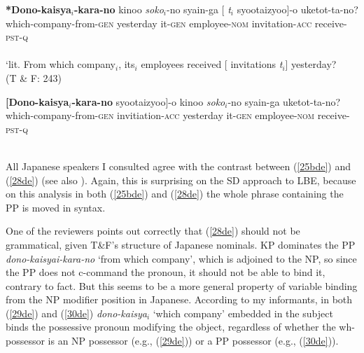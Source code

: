 \documentclass[
    output=paper,
    colorlinks,
    citecolor=brown,
]{langscibook}
\begin{document}
\begin{exe}
\begin{xlist}
\gll \textbf{*Dono-kaisya}$_{i}$\textbf{-kara-no}  kinoo  \textit{soko}$_{i}$-no syain-ga [ \textit{t}$_{i}$    syootaizyoo]-o uketot-ta-no?\\
which-company-from-\textsc{gen} yesterday it-\textsc{gen} employee-\textsc{nom} {} {} invitation-\textsc{acc} receive-\textsc{pst}-\textsc{q}\\\\
‘lit. From which company$_{i}$, its$_{i}$ employees received [ invitations \textit{t}$_{i}$] yesterday?\\
\hspace{79mm} (T \& F: 243)	


\end{xlist}

\ex \label{28de}
\gll \textbf{[Dono-kaisya$_{i}$-kara-no}      syootaizyoo]-o   kinoo       \textit{soko}$_{i}$-no syain-ga             uketot-ta-no?\\
which-company-from-\textsc{gen} invitiation-\textsc{acc} yesterday it-\textsc{gen} employee-\textsc{nom} receive-\textsc{pst}-\textsc{q}\\\\
\end{exe}



All Japanese speakers I consulted agree with the contrast between (\ref{25bde}) and (\ref{28de}) (see also \citealt{AranoOda2019}). Again, this is surprising on the SD approach to LBE, because on this analysis in both (\ref{25bde}) and (\ref{28de}) the whole phrase containing the PP is moved in syntax.

One of the reviewers points out correctly that (\ref{28de}) should not be grammatical, given T\&F’s structure of Japanese nominals. KP dominates the PP \textit{dono-kaisyai-kara-no} ‘from which company’, which is adjoined to the NP, so since the PP does not c-command the pronoun, it should not be able to bind it, contrary to fact. But this seems to be a more general property of variable binding from the NP modifier position in Japanese. According to my informants, in both (\ref{29de}) and (\ref{30de}) \textit{dono-kaisya}$_{i}$ ‘which company’ embedded in the subject binds the possessive pronoun modifying the object, regardless of whether the wh-possessor is an NP possessor (e.g., (\ref{29de})) or a PP possessor (e.g., (\ref{30de})).
\end{document}
